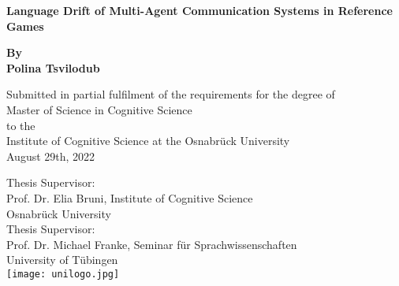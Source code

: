 \begin{titlepage}
	\begin{center}
		\vspace*{1cm}
		\Huge
		\textbf{Language Drift of Multi-Agent Communication Systems in Reference Games\\} 
		\vspace{0.5cm}
		\Large
	
		\textbf{By \\ Polina Tsvilodub}
		
		\vspace{1cm}
		\small
		Submitted in partial fulfilment of the requirements for the degree of \\
		Master of Science in Cognitive Science \\ to the \\
		Institute of Cognitive Science at the Osnabrück University\\
		August 29th, 2022
		
		\vspace{2cm}
		Thesis Supervisor:\\ Prof. Dr. Elia Bruni, Institute of Cognitive Science \\Osnabr\"uck University\\
		\vspace{0.5cm}
		Thesis Supervisor:\\ Prof. Dr. Michael Franke, Seminar f\"ur Sprachwissenschaften\\ University of T\"ubingen \\  
		\vfill 
		\texttt{[image: unilogo.jpg]}
		
	\end{center}
\end{titlepage}